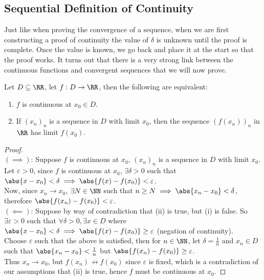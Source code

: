 \documentclass[../real_analysis.tex]{subfiles}
\begin{document}
        \subsection{Sequential Definition of Continuity}\label{subsec:sequential-definition-of-continuity}
            Just like when proving the convergence of a sequence, when we are first constructing a proof of continuity the value of $\delta$ is unknown until the proof is complete. Once the value is known, we go back and place it at the start so that the proof works.
            It turns out that there is a very strong link between the continuous functions and convergent sequences that we will now prove.
            \begin{theorem}\label{thm:seq-cont}
                Let $D\subseteq\RR$, let $f: D\to\RR$, then the following are equivalent:
                \begin{enumerate}[label={\upshape(\roman*)}]
                    \item $f$ is continuous at $x_0\in D$.
                    \item If $(x_n)_n$ is a sequence in $D$ with limit $x_0$, then the sequence $(f(x_n))_n$ in $\RR$ has limit $f(x_0)$.
                \end{enumerate}
            \end{theorem}
            \begin{proof}\\
                $(\implies)$: Suppose $f$ is continuous at $x_0$, $(x_n)_n$ is a sequence in $D$ with limit $x_0$.\\
                Let $\varepsilon>0$, since $f$ is continuous at $x_0$, $\exists\delta>0$ such that $\abs{x-x_0}<\delta\implies\abs{f(x)-f(x_0)}<\varepsilon$.\\
                Now, since $x_n\to x_0$, $\exists N\in\NN$ such that $n\geq N\implies\abs{x_n-x_0}<\delta$, therefore $\abs{f(x_n)-f(x_0)}<\varepsilon$.\\
                $(\impliedby)$: Suppose by way of contradiction that (ii) is true, but (i) is false. So $\exists\varepsilon>0$ such that $\forall\delta>0, \exists x\in D$ where $\abs{x-x_0}<\delta\implies\abs{f(x)-f(x_0)}\geq\varepsilon$ (negation of continuity).\\
                Choose $\varepsilon$ such that the above is satisfied, then for $n\in\NN$, let $\delta=\frac{1}{n}$ and $x_n\in D$ such that $\abs{x_n-x_0}<\frac{1}{n}$ but $\abs{f(x_n)-f(x_0)}\geq\varepsilon$.\\
                Thus $x_n\to x_0$, but $f(x_n)\not\to f(x_0)$ since $\varepsilon$ is fixed, which is a contradiction of our assumptions that (ii) is true, hence $f$ must be continuous at $x_0$.
            \end{proof}
\end{document}

